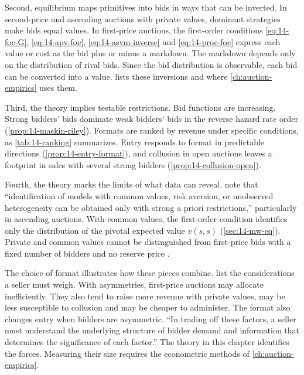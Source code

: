 Second, equilibrium maps primitives into bids in ways that can be inverted. In second-price and
ascending auctions with private values, dominant strategies make bids equal values. In first-price
auctions, the first-order conditions \eqref{eq:14-foc-G}, \eqref{eq:14-apv-foc},
\eqref{eq:14-asym-inverse} and \eqref{eq:14-proc-foc} express each value or cost as the bid plus or
minus a markdown. The markdown depends only on the distribution of rival bids. Since the bid distribution is
observable, each bid can be converted into a value.  lists these
inversions and where \cref{ch:auction-empirics} uses them.

Third, the theory implies testable restrictions. Bid functions are increasing. Strong bidders' bids
dominate weak bidders' bids in the reverse hazard rate order (\cref{prop:14-maskin-riley}). Formats
are ranked by revenue under specific conditions, as \cref{tab:14-ranking} summarizes. Entry responds
to format in predictable directions (\cref{prop:14-entry-format}), and collusion in open auctions
leaves a footprint in sales with several strong bidders (\cref{prop:14-collusion-open}).

Fourth, the theory marks the limits of what data can reveal. \citet[Section 1]{AtheyHaile2007} note
that ``identification of models with common values, risk aversion, or unobserved heterogeneity can be
obtained only with strong a priori restrictions,'' particularly in ascending auctions. With common
values, the first-order condition identifies only the distribution of the pivotal expected value
$v(s,s)$ (\cref{sec:14-mw-eq}). Private and common values cannot be distinguished from first-price
bids with a fixed number of bidders and no reserve price \citep[Section 7]{AtheyHaile2007}.

The choice of format illustrates how these pieces combine. \citet[Section 7]{AtheyHaile2007} list
the considerations a seller must weigh. With asymmetries, first-price auctions may allocate
inefficiently. They also tend to raise more revenue with private values, may be less susceptible to
collusion and may be cheaper to administer. The format also changes entry when bidders are
asymmetric. ``In trading off these factors, a seller must understand the underlying structure of
bidder demand and information that determines the significance of each factor.'' The theory in this
chapter identifies the forces. Measuring their size requires the econometric methods of
\cref{ch:auction-empirics}.
